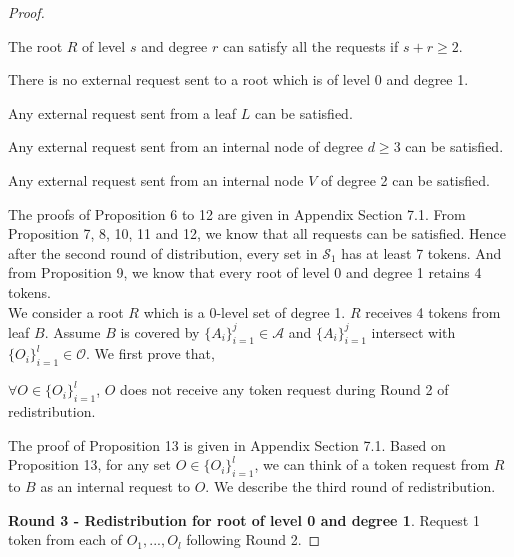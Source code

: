 \documentclass[runningheads,a4paper]{llncs}
\numberwithin{equation}{section}
\begin{document}
\begin{proof}
\begin{proposition}
The root $R$ of level $s$ and degree $r$ can satisfy all the requests if $s+r\geq 2$.
\end{proposition}


\begin{proposition}
There is no external request sent to a root which is of level 0 and degree 1.
\end{proposition}


\begin{proposition}
Any external request sent from a leaf $L$ can be satisfied.
\end{proposition}


\begin{proposition}
Any external request sent from an internal node of degree $d\geq 3$ can be satisfied.
\end{proposition}

\begin{proposition}
Any external request sent from an internal node $V$ of degree 2 can be satisfied.
\end{proposition}

The proofs of Proposition 6 to 12 are given in Appendix Section 7.1. From Proposition 7, 8, 10, 11 and 12, we know that all requests can be satisfied. Hence after the second round of distribution, every set in $\mathscr{S}_1$ has at least 7 tokens. And from Proposition 9, we know that every root of level 0 and degree 1 retains 4 tokens. \\


We consider a root $R$ which is a 0-level set of degree 1. $R$ receives 4 tokens from leaf $B$. Assume $B$ is covered by $\{A_i\}_{i=1}^j\in\mathscr{A}$ and $\{A_i\}_{i=1}^j$ intersect with $\{O_i\}_{i=1}^l\in\mathscr{O}$. We first prove that,

\begin{proposition}
$\forall O\in\{O_i\}_{i=1}^l$, $O$ does not receive any token request during Round 2 of redistribution.
\end{proposition}

The proof of Proposition 13 is given in Appendix Section 7.1. Based on Proposition 13, for any set $O\in\{O_i\}_{i=1}^l$, we can think of a token request from $R$ to $B$ as an internal request to $O$. We describe the third round of redistribution.

\textbf{Round 3 - Redistribution for root of level 0 and degree 1}. Request 1 token from each of $O_1,...,O_l$ following Round 2.


\end{proof}
\end{document}
